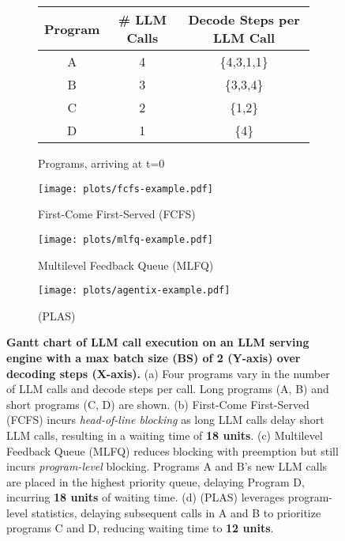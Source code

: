\begin{figure*}[!htb]
\begin{subfigure}{0.5\textwidth}
    \centering
    \begin{tabular}{|c|c|c|}
        \hline
        \textbf{Program} & \textbf{\# LLM Calls}  & \textbf{Decode Steps per LLM Call} \\ 
        \hline
        A & 4 & \{4,3,1,1\} \\
        B & 3 & \{3,3,4\} \\ 
        C & 2 & \{1,2\} \\
        D & 1 & \{4\} \\
        \hline
    \end{tabular}
    \vspace{3mm}
    \caption{Programs, arriving at t=0}
    \label{fig:program_runtimes}
\end{subfigure}\hfill
\begin{subfigure}{.48\textwidth}
    \centering
    \texttt{[image: plots/fcfs-example.pdf]}
    \caption{First-Come First-Served (FCFS)}
    \label{fig:fcfs_example}
\end{subfigure}\hfill
\vspace{-3mm}
\begin{subfigure}{.48\textwidth}
    \centering
    \texttt{[image: plots/mlfq-example.pdf]}
    \caption{Multilevel Feedback Queue (MLFQ)}
    \label{fig:mlfq_example}
\end{subfigure}\hfill
\begin{subfigure}{.48\textwidth}
    \centering
    \texttt{[image: plots/agentix-example.pdf]}
    \caption{\text{\algo} (PLAS)}
    \label{fig:agentix_example}
\end{subfigure}

\vspace{-2.5mm}
\caption{\small \textbf{Gantt chart of LLM call execution on an LLM serving engine with a max batch size (BS) of 2 (Y-axis) over decoding steps (X-axis).}  
(a) Four programs vary in the number of LLM calls and decode steps per call. Long programs (A, B) and short programs (C, D) are shown.  
(b) First-Come First-Served (FCFS) incurs \textit{head-of-line blocking} as long LLM calls delay short LLM calls, resulting in a waiting time of \textbf{18 units}.  
(c) Multilevel Feedback Queue (MLFQ) reduces blocking with preemption but still incurs \textit{program-level} blocking. Programs A and B's new LLM calls are placed in the highest priority queue, delaying Program D, incurring \textbf{18 units} of waiting time.  
(d) \text{\algo} (PLAS) leverages program-level statistics, delaying subsequent calls in A and B to prioritize programs C and D, reducing waiting time to \textbf{12 units}.}
\vspace{-5mm}
\label{fig:tutorial_example}
\end{figure*}
